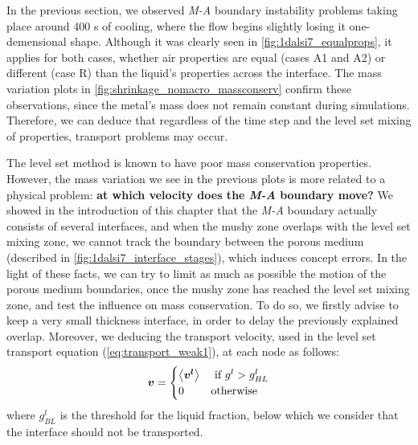 
In the previous section, we observed \emph{M-A} boundary instability problems taking place around 400 s of cooling, where the flow begins slightly losing it one-demensional
shape. Although it was clearly seen in \cref{fig:1dalsi7_equalprops}, it applies
for both cases, whether air properties are equal (cases A1 and A2) or different (case R) than the liquid's properties across the interface. 
The mass variation plots in \cref{fig:shrinkage_nomacro_massconserv} confirm these observations, since the metal's mass does not remain 
constant during simulations.
Therefore, we can deduce that regardless of the time step and the level set mixing of properties, 
transport problems may occur. 

The level set method is known to have poor mass conservation properties. However, the mass variation
we see in the previous plots is more related to a physical problem: \textbf{at which velocity does the \emph{M-A} boundary move?}
We showed in the introduction of this chapter that the \emph{M-A} boundary actually consists of several interfaces, 
and when the mushy zone overlaps with the level set mixing zone, we cannot track the boundary between the porous medium 
(described in \cref{fig:1dalsi7_interface_stages}), which induces concept errors.
In the light of these facts, we can try to limit as much as possible the motion of the porous medium boundaries, once the mushy zone has reached the level set mixing zone,
and test the influence on mass conservation.
To do so, we firstly advise to keep a very small thickness interface, in order to delay the previously explained overlap. Moreover, we deducing the 
transport velocity, used in the level set transport equation (\cref{eq:transport_weak1}), at each node as follows:
\begin{align}
\label{eq:}
\boldsymbol{v} =
\begin{cases}
  \left \langle \boldsymbol{v^l} \right \rangle		& \text{ if } g^l > g_{BL}^l \\
  0 		& \text{otherwise}
\end{cases}
\end{align}
where $g_{BL}^l$ is the threshold for the liquid fraction, below which we consider that the interface should not be transported.

